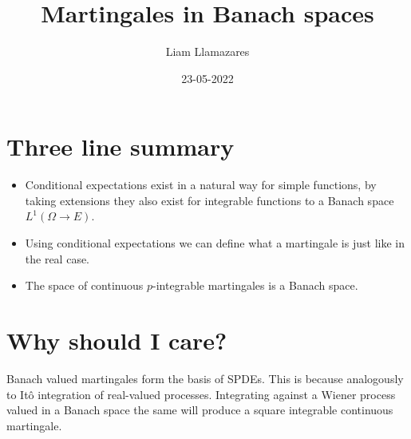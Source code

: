 \documentclass[12pt]{article}
\begin{document}
\title{Martingales in Banach spaces}
\author{Liam Llamazares}
\date{23-05-2022}
\maketitle
\section{Three line summary}
\begin{itemize}
	\item Conditional expectations exist in a natural way for simple functions, by taking extensions they also exist for integrable functions to a Banach space $L^1(\Omega\to E)$.
	\item Using conditional expectations we can define what a martingale is just like in the real case.
	\item The space of continuous $p$-integrable martingales is a Banach space.
\end{itemize}
\section{Why should I care?}
Banach valued martingales form the basis of SPDEs. This is because analogously to Itô integration of real-valued processes. Integrating against a Wiener process valued in a Banach space the same will produce a square integrable continuous martingale.
\end{document}

